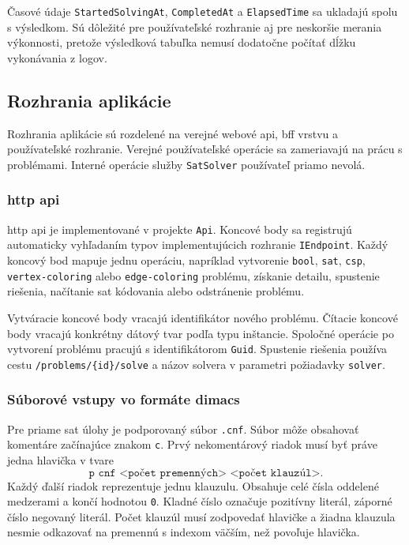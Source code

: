 Časové údaje \texttt{StartedSolvingAt}, \texttt{CompletedAt} a \texttt{ElapsedTime} sa ukladajú spolu s výsledkom. Sú dôležité pre používateľské rozhranie aj pre neskoršie merania výkonnosti, pretože výsledková tabuľka nemusí dodatočne počítať dĺžku vykonávania z logov.

\subsection{Rozhrania aplikácie}\label{sec:implementation:interfaces}
Rozhrania aplikácie sú rozdelené na verejné webové \acrshort{api}, \acrshort{bff} vrstvu a používateľské rozhranie. Verejné používateľské operácie sa zameriavajú na prácu s problémami. Interné operácie služby \texttt{SatSolver} používateľ priamo nevolá.

\subsubsection{\Acrshort{http} \acrshort{api}}\label{sec:implementation:http-api}
\Acrshort{http} \acrshort{api} je implementované v projekte \texttt{Api}. Koncové body sa registrujú automaticky vyhľadaním typov implementujúcich rozhranie \texttt{IEndpoint}. Každý koncový bod mapuje jednu operáciu, napríklad vytvorenie \texttt{bool}, \texttt{sat}, \texttt{csp}, \texttt{vertex-coloring} alebo \texttt{edge-coloring} problému, získanie detailu, spustenie riešenia, načítanie \acrshort{sat} kódovania alebo odstránenie problému.

Vytváracie koncové body vracajú identifikátor nového problému. Čítacie koncové body vracajú konkrétny dátový tvar podľa typu inštancie. Spoločné operácie po vytvorení problému pracujú s identifikátorom \texttt{Guid}. Spustenie riešenia používa cestu \texttt{/problems/\{id\}/solve} a názov solvera v parametri požiadavky \texttt{solver}.

\subsubsection{Súborové vstupy vo formáte \acrshort{dimacs}}\label{sec:implementation:dimacs-file-inputs}
Pre priame \acrshort{sat} úlohy je podporovaný súbor \texttt{.cnf}. Súbor môže obsahovať komentáre začínajúce znakom \texttt{c}. Prvý nekomentárový riadok musí byť práve jedna hlavička v tvare
\[
    \texttt{p cnf <počet premenných> <počet klauzúl>}.
\]
Každý ďalší riadok reprezentuje jednu klauzulu. Obsahuje celé čísla oddelené medzerami a končí hodnotou \texttt{0}. Kladné číslo označuje pozitívny literál, záporné číslo negovaný literál. Počet klauzúl musí zodpovedať hlavičke a žiadna klauzula nesmie odkazovať na premennú s indexom väčším, než povoľuje hlavička.

